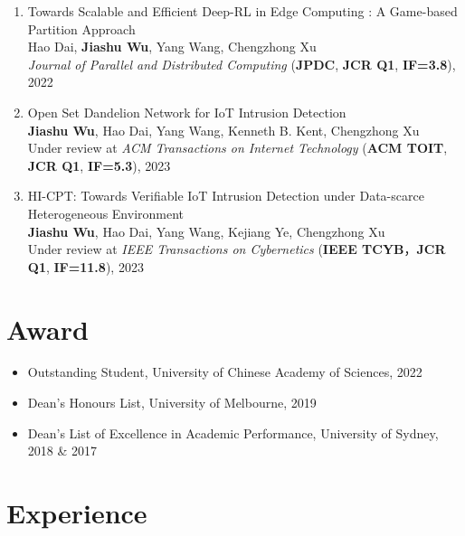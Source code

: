 \documentclass[letterpaper,11pt]{article}
\begin{document}
\begin{enumerate}
  \item Towards Scalable and Efficient Deep-RL in Edge Computing : A Game-based Partition Approach\\
  Hao Dai, \textbf{Jiashu Wu}, Yang Wang\textsuperscript{\Letter}, Chengzhong Xu\\
  \textit{Journal of Parallel and Distributed Computing} (\textbf{JPDC}, \textbf{JCR Q1}, \textbf{IF=3.8}), 2022

  \item Open Set Dandelion Network for IoT Intrusion Detection\\
  \textbf{Jiashu Wu}, Hao Dai, Yang Wang\textsuperscript{\Letter}, Kenneth B. Kent, Chengzhong Xu\\
  Under review at \textit{ACM Transactions on Internet Technology} (\textbf{ACM TOIT}, \textbf{JCR Q1}, \textbf{IF=5.3}), 2023

  \item HI-CPT: Towards Verifiable IoT Intrusion Detection under Data-scarce Heterogeneous Environment\\
  \textbf{Jiashu Wu}, Hao Dai, Yang Wang\textsuperscript{\Letter}, Kejiang Ye, Chengzhong Xu\\
  Under review at \textit{IEEE Transactions on Cybernetics} (\textbf{IEEE TCYB}，\textbf{JCR Q1}, \textbf{IF=11.8}), 2023
\end{enumerate}

\vspace{1pt}

\section{Award}
\begin{itemize}
  \item Outstanding Student, University of Chinese Academy of Sciences, 2022
  \item Dean's Honours List, University of Melbourne, 2019
  \item Dean's List of Excellence in Academic Performance, University of Sydney, 2018 \& 2017
\end{itemize}

\vspace{1pt}

\section{Experience}
\end{document}
